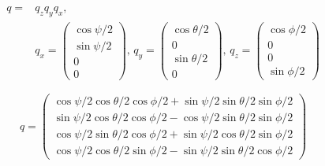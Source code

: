 \documentclass{article}
\begin{document}
\begin{displaymath}
\begin{split}
  q =& q_zq_yq_x, \\
  &q_x = \begin{pmatrix} \cos{\psi/2} \\
  \sin{\psi/2} \\ 0 \\ 0 \end{pmatrix}, \,
  q_y = \begin{pmatrix} \cos{\theta/2} \\
  0 \\ \sin{\theta/2} \\ 0 \end{pmatrix}, \,
  q_z = \begin{pmatrix} \cos{\phi/2} \\
  0 \\ 0 \\ \sin{\phi/2} \end{pmatrix}
\end{split}
\end{displaymath}

\begin{equation}
  q = \begin{pmatrix}
    \cos{\psi/2}\cos{\theta/2}\cos{\phi/2}+\sin{\psi/2}\sin{\theta/2}\sin{\phi/2} \\
    \sin{\psi/2}\cos{\theta/2}\cos{\phi/2}-\cos{\psi/2}\sin{\theta/2}\sin{\phi/2} \\
    \cos{\psi/2}\sin{\theta/2}\cos{\phi/2}+\sin{\psi/2}\cos{\theta/2}\sin{\phi/2} \\
    \cos{\psi/2}\cos{\theta/2}\sin{\phi/2}-\sin{\psi/2}\sin{\theta/2}\cos{\phi/2}
  \end{pmatrix}
\end{equation}
\end{document}
